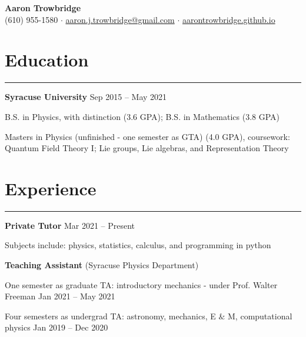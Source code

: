 \documentclass{article}
\newcommand{\myline}{\rule[\baselineskip]{\linewidth}{1pt}}
\begin{document}
\begin{center}
\huge
\textbf{Aaron Trowbridge}\\

\normalsize
(610) 955-1580 $\cdot$ \href{mailto:aaron.j.trowbridge@gmail.com}{aaron.j.trowbridge@gmail.com} $\cdot$ \href{https://aarontrowbridge.github.io/}{aarontrowbridge.github.io} \\

\end{center}


\section{Education}

\myline


\large\textbf{Syracuse University} \hfill \small Sep 2015 -- May 2021

\normalsize
\begin{compactitem}
\setlength\itemsep{0em}
\item B.S. in Physics, with distinction (3.6 GPA); B.S. in Mathematics (3.8 GPA) 
\item Masters in Physics (unfinished - one semester as GTA) (4.0 GPA), coursework: \\ Quantum Field Theory I; Lie groups, Lie algebras, and Representation Theory      
\end{compactitem}


\section{Experience}

\myline

\large\textbf{Private Tutor} \hfill \small Mar 2021 -- Present
\normalsize

\begin{compactitem}
\item Subjects include: physics, statistics, calculus, and programming in python
\end{compactitem}

\vspace{2.5pt}
\large\textbf{Teaching Assistant} \normalsize (Syracuse Physics Department)
\normalsize

\begin{compactitem}
\item One semester as graduate TA: introductory mechanics - under Prof. Walter Freeman \hfill \small Jan 2021 -- May 2021
\item Four semesters as undergrad TA: astronomy, mechanics, E $\&$ M, computational physics  \hfill \small Jan 2019 -- Dec 2020
\end{compactitem}
\end{document}
